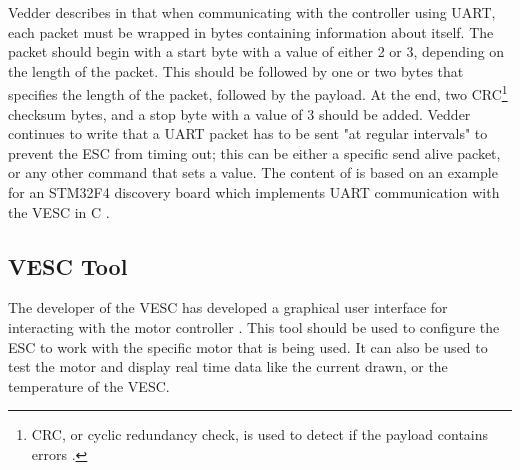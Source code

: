 Vedder describes in \cite{Vedder2015CommunicatingUART} that when communicating with the controller using UART, each packet must be wrapped in bytes containing information about itself. The packet should begin with a start byte with a value of either 2 or 3, depending on the length of the packet. This should be followed by one or two bytes that specifies the length of the packet, followed by the payload. At the end, two CRC\footnote{CRC, or cyclic redundancy check, is used to detect if the payload contains errors \cite{Technopedia2020WhatCRC}.} checksum bytes, and a stop byte with a value of 3 should be added. Vedder continues to write that a UART packet has to be sent "at regular intervals" to prevent the ESC from timing out; this can be either a specific send alive packet, or any other command that sets a value. The content of \cite{Vedder2015CommunicatingUART} is based on an example for an STM32F4 discovery board which implements UART communication with the VESC in C \cite{Vedder2018Vedderb/bldc_uart_comm_stm32f4_discovery:UART}.

\subsection{VESC Tool}
The developer of the VESC has developed a graphical user interface for interacting with the motor controller \cite{Vedder2016VESCESC}. This tool should be used to configure the ESC to work with the specific motor that is being used. It can also be used to test the motor and display real time data like the current drawn, or the temperature of the VESC.
